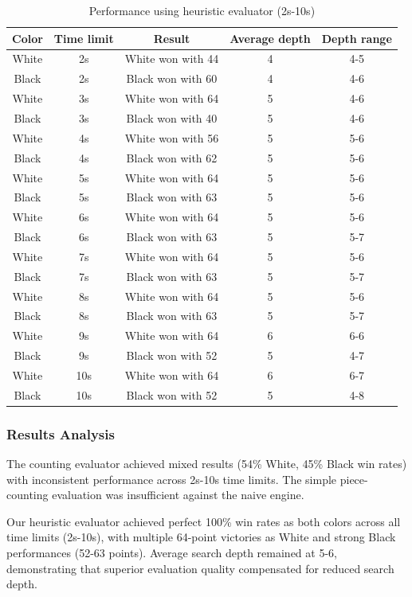 \documentclass[10pt, titlepage, oneside, a4paper]{article}
\begin{document}
\begin{table}[H]
    \centering
    \caption{Performance using heuristic evaluator (2s-10s)}
    \begin{tabular}{ccccc}
    \hline
    \textbf{Color} & \textbf{Time limit} & \textbf{Result} & \textbf{Average depth} & \textbf{Depth range} \\
    \hline
    White & 2s & White won with 44 & 4 & 4-5\\ 
    Black & 2s & Black won with 60 & 4 & 4-6\\
    White & 3s & White won with 64 & 5 & 4-6\\
    Black & 3s & Black won with 40 & 5 & 4-6\\
    White & 4s & White won with 56 & 5 & 5-6\\
    Black & 4s & Black won with 62 & 5 & 5-6\\
    White & 5s & White won with 64 & 5 & 5-6\\
    Black & 5s & Black won with 63 & 5 & 5-6\\
    White & 6s & White won with 64 & 5 & 5-6\\
    Black & 6s & Black won with 63 & 5 & 5-7\\
    White & 7s & White won with 64 & 5 & 5-6\\
    Black & 7s & Black won with 63 & 5 & 5-7\\
    White & 8s & White won with 64 & 5 & 5-6\\
    Black & 8s & Black won with 63 & 5 & 5-7\\
    White & 9s & White won with 64 & 6 & 6-6\\
    Black & 9s & Black won with 52 & 5 & 4-7\\
    White & 10s & White won with 64 & 6 & 6-7\\
    Black & 10s & Black won with 52 & 5 & 4-8\\
    \hline
    \end{tabular}    
    \label{tab:heuristic-results}
\end{table}


\subsubsection{Results Analysis}
The counting evaluator achieved mixed results (54\% White, 45\% Black win rates) with inconsistent performance across 2s-10s time limits. The simple piece-counting evaluation was insufficient against the naive engine.

Our heuristic evaluator achieved perfect 100\% win rates as both colors across all time limits (2s-10s), with multiple 64-point victories as White and strong Black performances (52-63 points). Average search depth remained at 5-6, demonstrating that superior evaluation quality compensated for reduced search depth.
\end{document}
